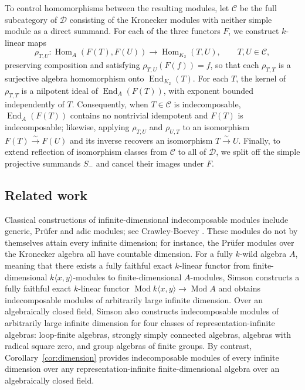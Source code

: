 \documentclass[a4paper,reqno,10pt]{amsart}
\theoremstyle{definition}
\DeclareMathOperator{\Hom}{Hom}
\DeclareMathOperator{\End}{End}
\DeclareMathOperator{\Mod}{Mod}
\newcommand{\D}{\mathcal D}
\newcommand{\C}{\mathcal C}
\numberwithin{equation}{section}
\begin{document}
To control homomorphisms between the resulting modules, let $\C$ be the
full subcategory of $\D$ consisting of the Kronecker modules with
neither simple module as a direct summand. For each of the three functors
$F$, we construct $k$-linear maps
\[
 \rho_{T,U}:\Hom_A(F(T),F(U))\longrightarrow\Hom_{K_2}(T,U),
 \qquad T,U\in\C,
\]
preserving composition and satisfying $\rho_{T,U}(F(f))=f$, so that each $\rho_{T,T}$ is a surjective algebra homomorphism onto $\End_{K_2}(T)$.
For each $T$, the kernel of $\rho_{T,T}$ is a nilpotent ideal of $\End_A(F(T))$,
with exponent bounded independently of $T$. Consequently, when $T\in\C$ is indecomposable,
$\End_A(F(T))$ contains no nontrivial idempotent and $F(T)$ is indecomposable;
likewise, applying $\rho_{T,U}$ and $\rho_{U,T}$ to an isomorphism $F(T)\xrightarrow{\sim}F(U)$ and its inverse recovers an
isomorphism $T\xrightarrow{\sim}U$. Finally, to extend reflection of isomorphism classes from $\C$ to all
of $\D$, we split off the simple projective summands $S_-$ and cancel their images under $F$.

\subsection{Related work}
\label{sec:intro-related}
Classical constructions of infinite-dimensional indecomposable modules include generic,
Pr\"ufer and adic modules; see Crawley-Boevey
\cite[\S\S1.3--1.5, 3.1]{CrawleyBoeveyInfinite}. These modules
do not by themselves attain every infinite dimension; for instance,
the Pr\"ufer modules over the Kronecker algebra all have countable
dimension.
For a fully $k$-wild algebra $A$, meaning that there exists a fully
faithful exact $k$-linear functor from finite-dimensional
$k\langle x,y\rangle$-modules to finite-dimensional $A$-modules,
Simson \cite[Proposition~2.2]{SimsonCorner} constructs a fully faithful
exact $k$-linear functor $\Mod k\langle x,y\rangle\to\Mod A$ and obtains
indecomposable modules of arbitrarily large infinite dimension.
Over an algebraically closed field, Simson \cite[Theorem~2.8]{SimsonLarge} also constructs indecomposable modules of
arbitrarily large infinite dimension for four classes of
representation-infinite algebras:
loop-finite algebras, strongly simply connected algebras, algebras with
radical square zero, and group algebras of finite groups.
By contrast, Corollary~\ref{cor:dimension} provides indecomposable modules of every infinite dimension over any
representation-infinite finite-dimensional algebra over an algebraically closed field.
\end{document}
